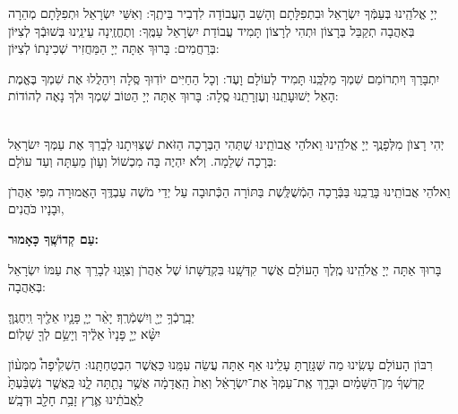 \documentclass[twoside, openany, parskip=half, 11pt]{book}
\begin{document}
\pageref{birkaskohanim}
	
 יְיָ אֱלֹהֵֽינוּ בְּעַמְּֿךָ יִשְׂרָאֵל וּבִתְפִלָּתָם וְהָשֵׁב הָעֲבוֹדָה לִדְבִיר בֵּיתֶֽךָ: וְאִשֵּׁי יִשְׂרָאֵל וּתְפִלָּתָם מְהֵרָה בְּאַהֲבָה תְקַבֵּל בְּרָצוֹן וּתְהִי לְרָצוֹן תָּמִיד עֲבוֹדַת יִשְׂרָאֵל עַמֶּֽךָ: וְתֶחֱזֶֽינָה עֵינֵֽינוּ בְּשׁוּבְֿךָ לְצִיּוֹן בְּרַחֲמִים: בָּרוּךְ אַתָּה יְיָ הַמַּחֲזִיר שְׁכִינָתוֹ לְצִיּוֹן:

\modim


\clearpage

 יִתְבָּרַךְ וְיִתְרוֹמַם שִׁמְךָ מַלְכֵּֽנוּ תָּמִיד לְעוֹלָם וָעֶד: וְכָל הַחַיִּים יוֹדֽוּךָ סֶּֽלָה וִיהַלֲלוּ אֶת שִׁמְךָ בֶּאֱמֶת הָאֵל יְשׁוּעָתֵֽנוּ וְעֶזְרָתֵֽנוּ סֶֽלָה: בָּרוּךְ אַתָּה יְיָ הַטּוֹב שִׁמְךָ וּלְךָ נָאֶה לְהוֹדוֹת:

\begin{sometimes}

\begin{paracol}{2}
\\
יְהִי רָצוׂן מִלְּפָנֶֽךָ יְיָ אֱלֹהֵֽינוּ וֵאלֹהֵי אֲבוׂתֵֽינוּ שֶׁתְּהִי הַבְּרָכָה הַזֹּאת שֶׁצִּוִּיתָנוּ לְבָרֵךְ אֶת עַמְּךָ יִשׂרָאֵל בְּרָכָה שְׁלֵמָה. וְלֹא יִהְיֶה בָּה מִכְשׁוֹל וְעָוׂן מֵעַתָּה וְעַד עוׂלָם:

\switchcolumn

\shatz {}
וֵאלֹהֵי אֲבוֹתֵֽינוּ בָּרֲכֵֽנוּ בַּבְּֿרָכָה הַמְֿשֻׁלֶּֽשֶׁת בַּתּוֹרָה הַכְּֿתוּבָה עַל יְדֵי מֹשֶׁה עַבְדֶּֽךָ הָאֲמוּרָה מִפִּי אַהֲרֹן וּבָנָיו כֹּהֲנִים,
 
\textbf{עַם קְדוֹשֶֽׁךָ כָּאָמוּר:}
\end{paracol}

בָּרוּךְ אַתָּה יְיָ אֱלֹהֵֽינוּ מֶֽלֶךְ הָעוֹלָם אֲשֶׁר קִדְּשָֽׁנוּ בִּקְדֻשָּׁתוֹ שֶׁל אַהֲרֹן  וְצִוָּֽנוּ לְבָרֵךְ אֶת עַמּוֹ יִשְׂרָאֵל בְּאַהֲבָה:

יְבָֽרֶכְֿךָ֥  יְיָ֖ וְיִשְׁמְֿרֶֽךָ׃ \quad יָאֵ֨ר יְיָ֧ פָּנָ֛יו אֵלֶ֖יךָ וִֽיחֻנֶּֽךָּ׃\\ יִשָּׂ֨א יְיָ֤ פָּנָיו֙ אֵלֶ֔יךָ וְיָשֵׂ֥ם לְךָ֖ שָׁלֽוֹם׃ 

\begin{paracol}{2}
רִבּוֹן הָעוֹלָם עָשִֽׂינוּ מַה שֶּׁגָּזַֽרְתָּ עָלֵֽינוּ אַף אַתָּה עֲשֵׂה עִמָּֽנוּ כַּאֲשֶׁר הִבְטַחְתָּֽנוּ:  הַשְׁקִ֩יפָה֩ מִמְּע֨וֹן קָדְשְׁךָ֜ מִן־הַשָּׁמַ֗יִם וּבָרֵ֤ךְ אֶֽת־עַמְּךָ֙ אֶת־יִשְׂרָאֵ֔ל וְאֵת֙ הָֽאֲדָמָ֔ה אֲשֶׁ֥ר נָתַ֖תָּה לָ֑נוּ כַּֽאֲשֶׁ֤ר נִשְׁבַּ֨עְתָּ֙ לַֽאֲבֹתֵ֔ינוּ אֶ֛רֶץ זָבַ֥ת חָלָ֖ב וּדְבָֽשׁ׃


\end{paracol}
\end{sometimes}
\end{document}
